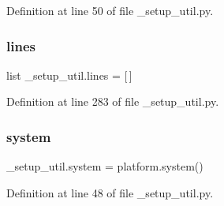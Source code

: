 Definition at line 50 of file \+\_\+setup\+\_\+util.\+py.

\mbox{\label{namespace__setup__util_a8618d8be5f729d4c9696daa5e083a001}} 
\subsubsection{\texorpdfstring{lines}{lines}}
{\footnotesize\ttfamily list \+\_\+setup\+\_\+util.\+lines = \mbox{[}$\,$\mbox{]}}



Definition at line 283 of file \+\_\+setup\+\_\+util.\+py.

\mbox{\label{namespace__setup__util_ae9fca6a80a6923f4580be72f68fee325}} 
\subsubsection{\texorpdfstring{system}{system}}
{\footnotesize\ttfamily \+\_\+setup\+\_\+util.\+system = platform.\+system()}



Definition at line 48 of file \+\_\+setup\+\_\+util.\+py.

